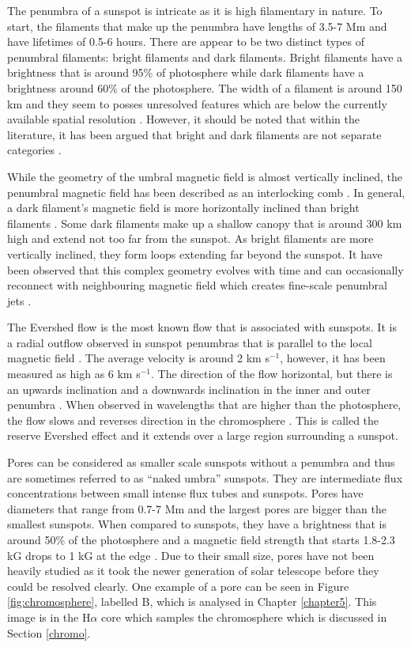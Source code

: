	The penumbra of a sunspot is intricate as it is high filamentary in nature.
	To start, the filaments that make up the penumbra have lengths of 3.5-7 Mm and have lifetimes of 0.5-6 hours.
	There are appear to be two distinct types of penumbral filaments: bright filaments and dark filaments.
	Bright filaments have a brightness that is around 95\% of photosphere while dark filaments have a brightness around 60\% of the photosphere.
	The width of a filament is around 150 km and they seem to posses unresolved features which are below the currently available spatial resolution \citep{2002Natur.420..151S,2011Sci...333..316S}.
	However, it should be noted that within the literature, it has been argued that bright and dark filaments are not separate categories \citep{2013A&A...557A..25T}. 
	
	While the geometry of the umbral magnetic field is almost vertically inclined, the penumbral magnetic field has been described as an interlocking comb \citep{2002Natur.420..390T}.
	In general, a dark filament's magnetic field is more horizontally inclined than bright filaments \citep{2005A&A...436.1087L}.
	Some dark filaments make up a shallow canopy that is around 300 km high and extend not too far from the sunspot.
	As bright filaments are more vertically inclined, they form loops extending far beyond the sunspot.
	It have been observed that this complex geometry evolves with time and can occasionally reconnect with neighbouring magnetic field which creates fine-scale penumbral jets \citep{2007Sci...318.1594K}.
	
	The Evershed flow is the most known flow that is associated with sunspots.
	It is a radial outflow observed in sunspot penumbras that is parallel to the local magnetic field \citep{2003A&A...403L..47B}.
	The average velocity is around 2 km s$^{-1}$, however, it has been measured as high as 6 km s$^{-1}$.
	The direction of the flow horizontal, but there is an upwards inclination and a downwards inclination in the inner and outer penumbra \citep{2004A&A...415..717T}.
	When observed in wavelengths that are higher than the photosphere, the flow slows and reverses direction in the chromosphere \citep{1997Natur.390..485M}.
	This is called the reserve Evershed effect and it extends over a large region surrounding a sunspot.
	
    Pores can be considered as smaller scale sunspots without a penumbra and thus are sometimes referred to as ``naked umbra'' sunspots.
    They are intermediate flux concentrations between small intense flux tubes and sunspots.
	Pores have diameters that range from 0.7-7 Mm and the largest pores are bigger than the smallest sunspots.
	When compared to sunspots, they have a brightness that is around 50\% of the photosphere and a magnetic field strength that starts 1.8-2.3 kG drops to 1 kG at the edge \citep{2014masu.book.....P}.
    Due to their small size, pores have not been heavily studied as it took the newer generation of solar telescope before they could be resolved clearly.
    One example of a pore can be seen in Figure \ref{fig:chromosphere}, labelled B, which is analysed in Chapter \ref{chapter5}.
    This image is in the H$\alpha$ core which samples the chromosphere which is discussed in Section \ref{chromo}.

